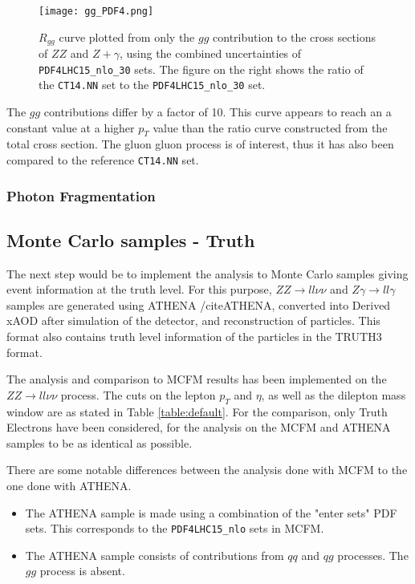 \documentclass[11pt,a4paper,final]{report}
\newcommand{\ZZ}{$ZZ\rightarrow ll\nu\nu$ }
\begin{document}
\begin{figure}[H]
\centering
	\texttt{[image: gg\_PDF4.png]}
	\caption{$R_{gg}$ curve plotted from only the $gg$ contribution to the cross sections of $ZZ$ and $Z+\gamma$, using the combined uncertainties of \texttt{PDF4LHC15\_nlo\_30} sets. The figure on the right shows the ratio of the \texttt{CT14.NN} set to the \texttt{PDF4LHC15\_nlo\_30} set.}
	\label{pdfcompare_gg}
\end{figure}
The $gg$ contributions differ by a factor of 10. This curve appears to reach an a constant value at a higher $p_T$ value than the ratio curve constructed from the total cross section. The gluon gluon process is of interest, thus it has also been compared to the reference \texttt{CT14.NN} set.

\subsubsection{Photon Fragmentation}

\subsection*{Monte Carlo samples - Truth}
\label{subsec:MC_truth}
The next step would be to implement the analysis to Monte Carlo samples giving event information at the truth level. For this purpose, $ZZ\rightarrow ll\nu\nu$ and $Z\gamma \rightarrow ll\gamma$ samples are generated using ATHENA /cite{ATHENA}, converted into Derived xAOD after simulation of the detector, and reconstruction of particles. This format also contains truth level information of the particles in the TRUTH3 format.

The analysis and comparison to MCFM results has been implemented on the \ZZ process. The cuts on the lepton $p_T$ and $\eta$, as well as the dilepton mass window are as stated in Table \ref{table:default}. For the comparison, only Truth Electrons have been considered, for the analysis on the MCFM and ATHENA samples to be as identical as possible. 

There are some notable differences between the analysis done with MCFM to the one done with ATHENA.
\begin{itemize}
	\item The ATHENA sample is made using a combination of the "enter sets" PDF sets. This corresponds to the \texttt{PDF4LHC15\_nlo} sets in MCFM.
	\item The ATHENA sample consists of contributions from $qq$ and $qg$ processes. The $gg$ process is absent.
\end{itemize}
\end{document}
